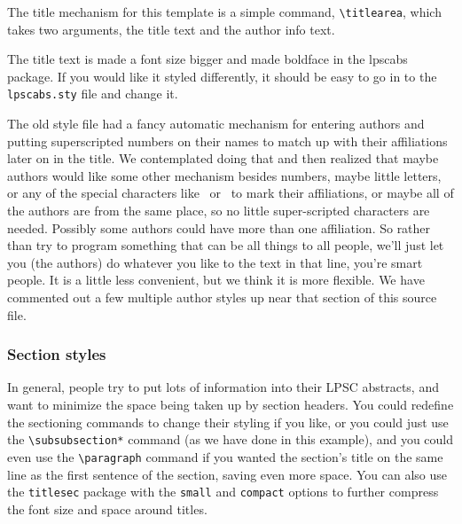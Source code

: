 \documentclass[twoside]{article}
\begin{document}
The title mechanism for this template is a simple command,
\verb=\titlearea=, which takes two arguments, the title text and the
author info text.

The title text is made a font size bigger and made boldface in the
lpscabs package.  If you would like it styled differently, it should
be easy to go in to the \texttt{lpscabs.sty} file and change it.

The old style file had a fancy automatic mechanism for entering
authors and putting superscripted numbers on their names to match
up with their affiliations later on in the title.  We contemplated
doing that and then realized that maybe authors would like some
other mechanism besides numbers, maybe little letters, or any of
the special characters like \dag\ or \ddag\ to mark their affiliations,
or maybe all of the authors are from the same place, so no little
super-scripted characters are needed.  Possibly some authors could
have more than one affiliation.  So rather than try to program
something that can be all things to all people, we'll just let you
(the authors) do whatever you like to the text in that line, you're
smart people.  It is a little less convenient, but we think it is more
flexible.  We have commented out a few multiple author styles up
near that section of this source file.

% 

\subsubsection*{Section styles}

In general, people try to put lots of information into their LPSC
abstracts, and want to minimize the space being taken up by section
headers.  You could redefine the sectioning commands to change their
styling if you like, or you could just use the \verb=\subsubsection*=
command (as we have done in this example), and
you could even use the \verb=\paragraph= command if you wanted the
section's title on the same line as the first sentence of the
section, saving even more space.  You can also use the \texttt{titlesec}
package with the \texttt{small} and \texttt{compact} options to further
compress the font size and space around titles.
\end{document}
